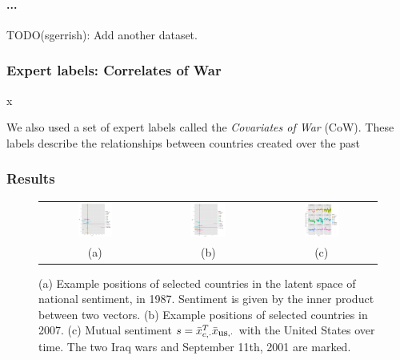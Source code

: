 \paragraph{...}
TODO(sgerrish): Add another dataset.
  
\subsubsection{Expert labels: Correlates of War}x

We also used a set of expert labels called the \emph{Covariates of
  War} (CoW).  These labels describe the relationships between
countries created over the past

\subsubsection{Results}
 \begin{figure}
  \begin{tabular}{ccc}
    \includegraphics[width=0.33\textwidth]{chapter_foreign_relations/figures/002_countries_by_ip_1987.pdf} &
    \includegraphics[width=0.33\textwidth]{chapter_foreign_relations/figures/002_countries_by_ip_2007.pdf} &
    \includegraphics[width=0.33\textwidth]{chapter_foreign_relations/figures/002_us_vs_everyone.pdf} \\
    (a) & (b) & (c) \\
  \end{tabular}
  \caption{
    (a) Example positions of selected countries in the latent space of national sentiment, in 1987. Sentiment is given by the inner product between two vectors.
    (b) Example positions of selected countries in 2007.
    (c) Mutual sentiment $s = \bar x_{c, \cdot}^T \bar x_{\mbox{\small us}, \cdot}$ with the United States over time. The two Iraq wars and September 11th, 2001 are marked.
  }
  \label{figure:figures}
\end{figure}

